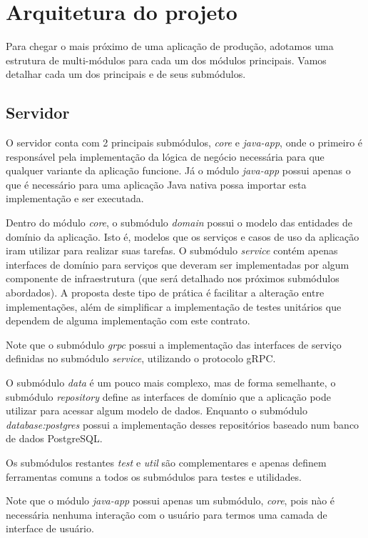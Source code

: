 \documentclass{article}
\begin{document}
\section{Arquitetura do projeto}

Para chegar o mais próximo de uma aplicação de produção, adotamos uma estrutura de multi-módulos para cada um dos
módulos principais. Vamos detalhar cada um dos principais e de seus submódulos.

\subsection{Servidor}

O servidor conta com 2 principais submódulos, \textit{core} e \textit{java-app}, onde o primeiro é responsável pela 
implementação da lógica de negócio necessária para que qualquer variante da aplicação funcione. Já o módulo \textit{java-app}
possui apenas o que é necessário para uma aplicação Java nativa possa importar esta implementação e ser executada.

Dentro do módulo \textit{core}, o submódulo \textit{domain} possui o modelo das entidades de domínio da aplicação. Isto é,
modelos que os serviços e casos de uso da aplicação iram utilizar para realizar suas tarefas. O submódulo
\textit{service} contém apenas interfaces de domínio para serviços que deveram ser implementadas por algum componente
de infraestrutura (que será detalhado nos próximos submódulos abordados). A proposta deste tipo de prática é facilitar
a alteração entre implementações, além de simplificar a implementação de testes unitários que dependem de alguma
implementação com este contrato.

Note que o submódulo \textit{grpc} possui a implementação das interfaces de serviço definidas no submódulo \textit{service},
utilizando o protocolo gRPC.

O submódulo \textit{data} é um pouco mais complexo, mas de forma semelhante, o submódulo \textit{repository} define as interfaces
de domínio que a aplicação pode utilizar para acessar algum modelo de dados. Enquanto o submódulo 
\textit{database:postgres} possui a implementação desses repositórios baseado num banco de dados PostgreSQL.

Os submódulos restantes \textit{test} e \textit{util} são complementares e apenas definem ferramentas comuns a todos os submódulos
para testes e utilidades.

Note que o módulo \textit{java-app} possui apenas um submódulo, \textit{core}, pois nào é necessária nenhuma interação com o
usuário para termos uma camada de interface de usuário.
\end{document}
